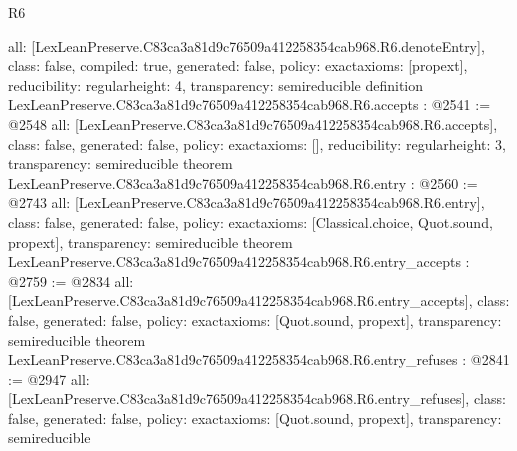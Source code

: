 \begin{lexlean}{R6}
\begin{coremodule}
{  all: [LexLeanPreserve.C83ca3a81d9c76509a412258354cab968.R6.denoteEntry],
  class: false,
  compiled: true,
  generated: false,
  policy: exact{axioms: [propext]},
  reducibility: regular{height: 4},
  transparency: semireducible
}
definition LexLeanPreserve.C83ca3a81d9c76509a412258354cab968.R6.accepts : @2541 := @2548 {
  all: [LexLeanPreserve.C83ca3a81d9c76509a412258354cab968.R6.accepts],
  class: false,
  generated: false,
  policy: exact{axioms: []},
  reducibility: regular{height: 3},
  transparency: semireducible
}
theorem LexLeanPreserve.C83ca3a81d9c76509a412258354cab968.R6.entry : @2560 := @2743 {
  all: [LexLeanPreserve.C83ca3a81d9c76509a412258354cab968.R6.entry],
  class: false,
  generated: false,
  policy: exact{axioms: [Classical.choice, Quot.sound, propext]},
  transparency: semireducible
}
theorem LexLeanPreserve.C83ca3a81d9c76509a412258354cab968.R6.entry_accepts : @2759 := @2834 {
  all: [LexLeanPreserve.C83ca3a81d9c76509a412258354cab968.R6.entry_accepts],
  class: false,
  generated: false,
  policy: exact{axioms: [Quot.sound, propext]},
  transparency: semireducible
}
theorem LexLeanPreserve.C83ca3a81d9c76509a412258354cab968.R6.entry_refuses : @2841 := @2947 {
  all: [LexLeanPreserve.C83ca3a81d9c76509a412258354cab968.R6.entry_refuses],
  class: false,
  generated: false,
  policy: exact{axioms: [Quot.sound, propext]},
  transparency: semireducible
}


\end{coremodule}
\end{lexlean}
